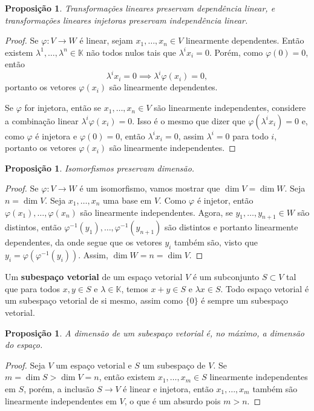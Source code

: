 \documentclass{article}
\newtheorem{proposition}[definition]{Proposição}
\renewcommand{\phi}{\varphi}
\begin{document}
\begin{proposition}
    Transformações lineares preservam dependência linear, e transformações lineares injetoras preservam independência linear.
\end{proposition}
\begin{proof}
    Se $\phi \colon V \to W$ é linear, sejam $x_1, \dots, x_n \in V$ linearmente dependentes. Então existem $\lambda^1, \dots, \lambda^n \in \mathbb{K}$ não todos nulos tais que $\lambda^i x_i = 0$. Porém, como $\phi(0) = 0$, então \begin{equation}
        \lambda^i x_i = 0 \implies \lambda^i \phi(x_i) = 0,
    \end{equation} portanto os vetores $\phi(x_i)$ são linearmente dependentes.

    Se $\phi$ for injetora, então se $x_1, \dots, x_n \in V$ são linearmente independentes, considere a combinação linear $\lambda^i \phi(x_i) = 0$. Isso é o mesmo que dizer que $\phi(\lambda^i x_i) = 0$ e, como $\phi$ é injetora e $\phi(0) = 0$, então $\lambda^i x_i = 0$, assim $\lambda^i = 0$ para todo $i$, portanto os vetores $\phi(x_i)$ são linearmente independentes.
\end{proof}

\begin{proposition}
    Isomorfismos preservam dimensão.
\end{proposition}
\begin{proof}
    Se $\phi \colon V \to W$ é um isomorfismo, vamos mostrar que $\dim V = \dim W$. Seja $n = \dim V$. Seja $x_1, \dots, x_n$ uma base em $V$. Como $\phi$ é injetor, então $\phi(x_1), \dots, \phi(x_n)$ são linearmente independentes. Agora, se $y_1, \dots, y_{n+1} \in W$ são distintos, então $\phi^{-1}(y_1), \dots, \phi^{-1}(y_{n+1})$ são distintos e portanto linearmente dependentes, da onde segue que os vetores $y_i$ também são, visto que $y_i = \phi(\phi^{-1}(y_i))$. Assim, $\dim W = n = \dim V$.
\end{proof}

Um \textbf{subespaço vetorial} de um espaço vetorial $V$ é um subconjunto $S \subset V$ tal que para todos $x, y \in S$ e $\lambda \in \mathbb{K}$, temos $x + y \in S$ e $\lambda x \in S$. Todo espaço vetorial é um subespaço vetorial de si mesmo, assim como $\{0\}$ é sempre um subespaço vetorial.

\begin{proposition}
    A dimensão de um subespaço vetorial é, no máximo, a dimensão do espaço.
\end{proposition}
\begin{proof}
    Seja $V$ um espaço vetorial e $S$ um subespaço de $V$. Se $m = \dim S > \dim V = n$, então existem $x_1, \dots, x_m \in S$ linearmente independentes em $S$, porém, a inclusão $S \to V$ é linear e injetora, então $x_1, \dots, x_m$ também são linearmente independentes em $V$, o que é um absurdo pois $m > n$.
\end{proof}
\end{document}
